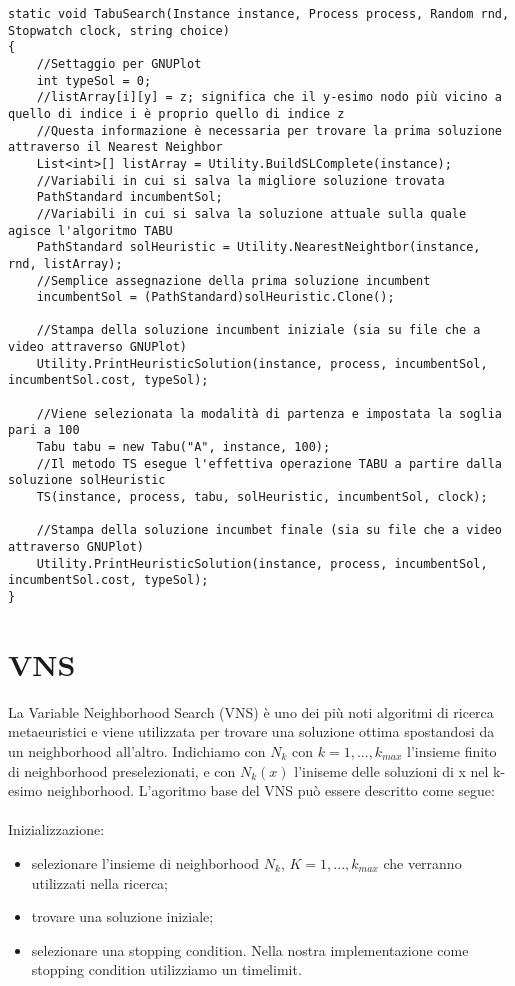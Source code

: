 \begin{lstlisting}
static void TabuSearch(Instance instance, Process process, Random rnd, Stopwatch clock, string choice)
{
    //Settaggio per GNUPlot
    int typeSol = 0;
    //listArray[i][y] = z; significa che il y-esimo nodo più vicino a quello di indice i è proprio quello di indice z
    //Questa informazione è necessaria per trovare la prima soluzione attraverso il Nearest Neighbor
    List<int>[] listArray = Utility.BuildSLComplete(instance);
    //Variabili in cui si salva la migliore soluzione trovata
    PathStandard incumbentSol;
    //Variabili in cui si salva la soluzione attuale sulla quale agisce l'algoritmo TABU
    PathStandard solHeuristic = Utility.NearestNeightbor(instance, rnd, listArray);
    //Semplice assegnazione della prima soluzione incumbent
    incumbentSol = (PathStandard)solHeuristic.Clone();
    
    //Stampa della soluzione incumbent iniziale (sia su file che a video attraverso GNUPlot)
    Utility.PrintHeuristicSolution(instance, process, incumbentSol, incumbentSol.cost, typeSol);

    //Viene selezionata la modalità di partenza e impostata la soglia pari a 100
    Tabu tabu = new Tabu("A", instance, 100);
    //Il metodo TS esegue l'effettiva operazione TABU a partire dalla soluzione solHeuristic
    TS(instance, process, tabu, solHeuristic, incumbentSol, clock);
    
    //Stampa della soluzione incumbet finale (sia su file che a video attraverso GNUPlot)
    Utility.PrintHeuristicSolution(instance, process, incumbentSol, incumbentSol.cost, typeSol);
}
\end{lstlisting}


\chapter{VNS}
La Variable Neighborhood Search (VNS) è uno dei più noti algoritmi di ricerca metaeuristici e viene utilizzata per trovare una soluzione ottima spostandosi da un neighborhood all'altro.
Indichiamo con $N_k$ con $k=1,...,k_{max}$ l'insieme finito di neighborhood preselezionati, e con $N_k(x)$ l'iniseme delle soluzioni di x nel k-esimo neighborhood. L'agoritmo base del VNS può essere descritto come segue:\\\\

Inizializzazione: 
\begin{itemize}
\item selezionare l'insieme di neighborhood $N_k$, $K=1,...,k_{max}$ che verranno utilizzati nella ricerca;
\item trovare una soluzione iniziale;
\item selezionare una stopping condition. Nella nostra implementazione come stopping condition utilizziamo un timelimit.
\end{itemize} 

